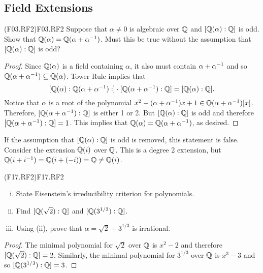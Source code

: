 \documentclass[../AlgebraQualSolutions.tex]{subfiles}
\begin{document}
\subsection{Field Extensions}

\begin{prob}{(F03.RF2)}{F03.RF2}
	Suppose that $\alpha \neq 0$ is algebraic over $\mathbb{Q}$ and $[\mathbb{Q}(\alpha): \mathbb{Q}]$ is odd. Show that $\mathbb{Q}(\alpha) = \mathbb{Q}(\alpha + \alpha^{-1})$. Must this be true without the assumption that $[\mathbb{Q}(\alpha): \mathbb{Q}]$ is odd?
\end{prob}

\begin{proof}
	Since $\mathbb{Q}(\alpha)$ is a field containing $\alpha$, it also must contain $\alpha + \alpha^{-1}$ and so $\mathbb{Q}(\alpha + \alpha^{-1}) \subseteq \mathbb{Q}(\alpha)$. Tower Rule implies that
		\[[\mathbb{Q}(\alpha): \mathbb{Q}(\alpha + \alpha^{-1}):] \cdot [\mathbb{Q}(\alpha + \alpha^{-1}): \mathbb{Q}] = [\mathbb{Q}(\alpha): \mathbb{Q}].\]
	Notice that $\alpha$ is a root of the polynomial $x^2 - (\alpha + \alpha^{-1})x + 1 \in \mathbb{Q}(\alpha + \alpha^{-1})[x]$. Therefore, $[\mathbb{Q}(\alpha + \alpha^{-1}): \mathbb{Q}]$ is either 1 or 2. But $[\mathbb{Q}(\alpha): \mathbb{Q}]$ is odd and therefore $[\mathbb{Q}(\alpha + \alpha^{-1}): \mathbb{Q}] = 1$. This implies that $\mathbb{Q}(\alpha) = \mathbb{Q}(\alpha + \alpha^{-1})$, as desired.
\end{proof}

If the assumption that $[\mathbb{Q}(\alpha): \mathbb{Q}]$ is odd is removed, this statement is false. Consider the extension $\mathbb{Q}(i)$ over $\mathbb{Q}$. This is a degree 2 extension, but $\mathbb{Q}(i + i^{-1}) = \mathbb{Q}(i + (-i)) = \mathbb{Q} \neq \mathbb{Q}(i)$.

\begin{prob}{(F17.RF2)}{F17.RF2}
	\begin{enumerate}[(i)]
		\item State Eisenstein's irreducibility criterion for polynomials.
		\item Find $[\mathbb{Q}(\sqrt 2): \mathbb{Q}]$ and $[\mathbb{Q}(3^{1/3}): \mathbb{Q}]$.
		\item Using (ii), prove that $\alpha = \sqrt{2}+3^{1/3}$ is irrational.
	\end{enumerate}
\end{prob}

\begin{proof}
	The minimal polynomial for $\sqrt2$ over $\mathbb{Q}$ is $x^2 - 2$ and therefore $[\mathbb{Q}(\sqrt 2): \mathbb{Q}] =2$. Similarly, the minimal polynomial for $3^{1/3}$ over $\mathbb{Q}$ is $x^3 - 3$ and so $[\mathbb{Q}(3^{1/3}): \mathbb{Q}] = 3$.
\end{proof}
\end{document}
